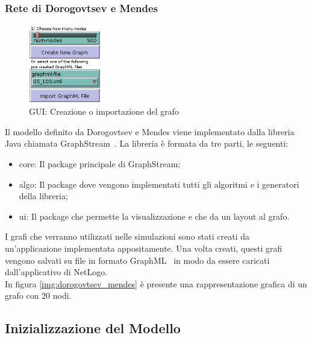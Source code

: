 \subsubsection{Rete di Dorogovtsev e Mendes}
\label{section:graph_topologies_dm}

\begin{figure}
  \vspace*{-25pt}
  \begin{center}
    \includegraphics[width=0.28\textwidth]{img/gui-graph.png}
  \end{center}
 \vspace*{-10pt}
 \caption{GUI: Creazione o importazione del grafo}
 \vspace*{-35pt}
 \label{img:gui_graph}
\end{figure}

Il modello definito da Dorogovtsev e Mendes viene implementato dalla libreria Java chiamata GraphStream~\cite{biblio:graphstream}.
La libreria è formata da tre parti, le seguenti: 
\begin{itemize}
 \item core: Il package principale di GraphStream;
 \item algo: Il package dove vengono implementati tutti gli algoritmi e i generatori della libreria;
 \item ui: Il package che permette la visualizzazione e che da un layout al grafo.
\end{itemize}
I grafi che verranno utilizzati nelle simulazioni sono stati creati da un'applicazione implementata appositamente.
Una volta creati, questi grafi vengono salvati su file in formato GraphML~\cite{biblio:graphml} in modo da 
essere caricati dall'applicativo di NetLogo. \\
In figura \ref{img:dorogovtsev_mendes} è presente una rappresentazione grafica di un grafo con 20 nodi.



\subsection{Inizializzazione del Modello}
\label{section:gui_setup_graph}

